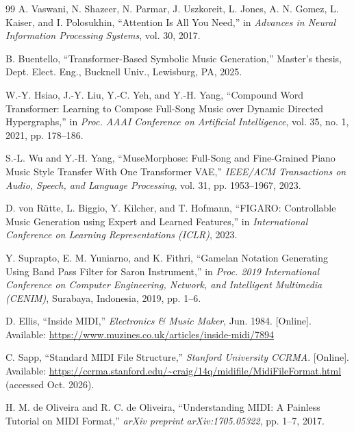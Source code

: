\documentclass[conference,a4paper]{IEEEtran}
\begin{document}
\begin{thebibliography}{99}
A. Vaswani, N. Shazeer, N. Parmar, J. Uszkoreit, L. Jones, A. N. Gomez, L. Kaiser, and I. Polosukhin,
``Attention Is All You Need,''
in \textit{Advances in Neural Information Processing Systems}, vol. 30, 2017.

B. Buentello,
``Transformer-Based Symbolic Music Generation,''
Master's thesis, Dept. Elect. Eng., Bucknell Univ., Lewisburg, PA, 2025.

W.-Y. Hsiao, J.-Y. Liu, Y.-C. Yeh, and Y.-H. Yang,
``Compound Word Transformer: Learning to Compose Full-Song Music over Dynamic Directed Hypergraphs,''
in \textit{Proc. AAAI Conference on Artificial Intelligence}, vol. 35, no. 1, 2021, pp. 178--186.

S.-L. Wu and Y.-H. Yang,
``MuseMorphose: Full-Song and Fine-Grained Piano Music Style Transfer With One Transformer VAE,''
\textit{IEEE/ACM Transactions on Audio, Speech, and Language Processing}, vol. 31, pp. 1953--1967, 2023.

D. von R\"{u}tte, L. Biggio, Y. Kilcher, and T. Hofmann,
``FIGARO: Controllable Music Generation using Expert and Learned Features,''
in \textit{International Conference on Learning Representations (ICLR)}, 2023.

Y. Suprapto, E. M. Yuniarno, and K. Fithri,
``Gamelan Notation Generating Using Band Pass Filter for Saron Instrument,''
in \textit{Proc. 2019 International Conference on Computer Engineering, Network, and Intelligent Multimedia (CENIM)},
Surabaya, Indonesia, 2019, pp. 1--6.

D. Ellis,
``Inside MIDI,''
\textit{Electronics \& Music Maker}, Jun. 1984. [Online].
Available: \url{https://www.muzines.co.uk/articles/inside-midi/7894}

C. Sapp,
``Standard MIDI File Structure,''
\textit{Stanford University CCRMA}. [Online].
Available: \url{https://ccrma.stanford.edu/~craig/14q/midifile/MidiFileFormat.html} (accessed Oct. 2026).

H. M. de Oliveira and R. C. de Oliveira,
``Understanding MIDI: A Painless Tutorial on MIDI Format,''
\textit{arXiv preprint arXiv:1705.05322}, pp. 1–7, 2017.


\end{thebibliography}
\end{document}
